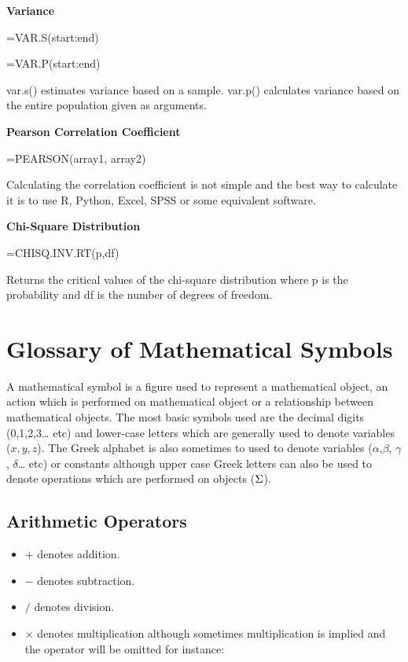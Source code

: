 \documentclass[
]{book}
\providecommand{\tightlist}{%
  \setlength{\itemsep}{0pt}\setlength{\parskip}{0pt}}
\begin{document}
\textbf{Variance}

=VAR.S(start:end)

=VAR.P(start:end)

var.s() estimates variance based on a sample. var.p() calculates variance based on the entire population given as arguments.

\textbf{Pearson Correlation Coefficient}

=PEARSON(array1, array2)

Calculating the correlation coefficient is not simple and the best way to calculate it is to use R, Python, Excel, SPSS or some equivalent software.

\textbf{Chi-Square Distribution}

=CHISQ.INV.RT(p,df)

Returns the critical values of the chi-square distribution where p is the probability and df is the number of degrees of freedom.

\hypertarget{glossary-of-mathematical-symbols}{%
\section*{Glossary of Mathematical Symbols}\label{glossary-of-mathematical-symbols}}

A mathematical symbol is a figure used to represent a mathematical object, an action which is performed on mathematical object or a relationship between mathematical objects. The most basic symbols used are the decimal digits (0,1,2,3\ldots{} etc) and lower-case letters which are generally used to denote variables (\(x,y,z\)). The Greek alphabet is also sometimes to used to denote variables (\(\alpha\),\(\beta\), \(\gamma\), \(\delta\)\ldots{} etc) or constants although upper case Greek letters can also be used to denote operations which are performed on objects (\(\large\Sigma\)).

\hypertarget{arithmetic-operators}{%
\subsection*{Arithmetic Operators}\label{arithmetic-operators}}

\begin{itemize}
\tightlist
\item
  \(+\) denotes addition.
\item
  \(-\) denotes subtraction.
\item
  \(/\) denotes division.
\item
  \(\times\) denotes multiplication although sometimes multiplication is implied and the operator will be omitted for instance:
\end{itemize}
\end{document}
